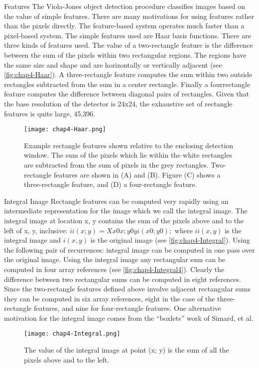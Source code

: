 \begin{compactitem}
\item {Features}
The Viola-Jones object detection procedure classifies images based on the value of simple features.
There are many motivations for using features rather than the pixels directly. The feature-based system 
operates much faster than a pixel-based system.
The simple features used are Haar basis functions. There are three kinds of features used. 
The value of a two-rectangle feature is the difference between the sum of the pixels within
two rectangular regions. The regions have the same size and shape and are horizontally
or vertically adjacent (see \autoref{fig:chap4-Haar}). A three-rectangle feature computes the sum within
two outside rectangles subtracted from the sum in a center rectangle. Finally a fourrectangle
feature computes the difference between diagonal pairs of rectangles.
Given that the base resolution of the detector is 24x24, the exhaustive set of rectangle
features is quite large, 45,396.

\begin{figure}[h]
  \centering
	\texttt{[image: chap4-Haar.png]}
  \caption{Example rectangle features shown relative to the enclosing detection window.
The sum of the pixels which lie within the white rectangles are subtracted from the
sum of pixels in the grey rectangles. Two-rectangle features are shown in (A) and (B).
Figure (C) shows a three-rectangle feature, and (D) a four-rectangle feature.}
  \label{fig:chap4-Haar}
\end{figure}

\item {Integral Image}
Rectangle features can be computed very rapidly using an intermediate representation
for the image which we call the integral image. The integral image at location x, y
contains the sum of the pixels above and to the left of x, y, inclusive:
$ii(x; y) = X x0x;y0yi(x0; y0);$
where $ii(x, y)$ is the integral image and $i(x, y)$ is the original image (see \autoref{fig:chap4-Integral}).
Using the following pair of recurrences:
integral image can be computed in one pass over the original image.
Using the integral image any rectangular sum can be computed in four array references
(see  \autoref{fig:chap4-Integral4}). Clearly the difference between two rectangular sums can be
computed in eight references. Since the two-rectangle features defined above involve
adjacent rectangular sums they can be computed in six array references, eight in the
case of the three-rectangle features, and nine for four-rectangle features.
One alternative motivation for the integral image comes from the “boxlets” work
of Simard, et al.
\begin{figure}[h]
  \centering
	\texttt{[image: chap4-Integral.png]}
  \caption{The value of the integral image at point (x; y) is the sum of all the pixels
above and to the left.}
  \label{fig:chap4-Integral}
\end{figure}


\end{compactitem}
